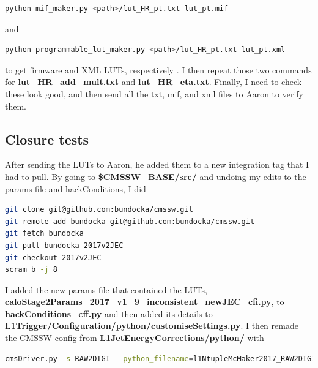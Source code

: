 \begin{lstlisting}[belowskip=-0.7cm, language=sh, numbers=none]
python mif_maker.py <path>/lut_HR_pt.txt lut_pt.mif
\end{lstlisting}

and

\begin{lstlisting}[belowskip=-0.7cm, language=sh, numbers=none]
python programmable_lut_maker.py <path>/lut_HR_pt.txt lut_pt.xml
\end{lstlisting}

to get firmware and XML LUTs, respectively . I then repeat those two commands for \textbf{lut\_HR\_add\_mult.txt} and \textbf{lut\_HR\_eta.txt}. Finally, I need to check these look good, and then send all the txt, mif, and xml files to Aaron to verify them.


\subsection{Closure tests}

After sending the LUTs to Aaron, he added them to a new integration tag that I had to pull. By going to \textbf{\$CMSSW\_BASE/src/} and undoing my edits to the params file and hackConditions, I did

\begin{lstlisting}[belowskip=-0.7cm, language=sh, numbers=none]
git clone git@github.com:bundocka/cmssw.git
git remote add bundocka git@github.com:bundocka/cmssw.git
git fetch bundocka
git pull bundocka 2017v2JEC
git checkout 2017v2JEC
scram b -j 8
\end{lstlisting}

I added the new params file that contained the LUTs, \textbf{caloStage2Params\_2017\_v1\_9\_inconsistent\_newJEC\_cfi.py}, to \textbf{hackConditions\_cff.py} and then added its details to \textbf{L1Trigger/Configuration/python/customiseSettings.py}. I then remade the CMSSW config from \textbf{L1JetEnergyCorrections/python/} with

\begin{lstlisting}[belowskip=-0.7cm, language=sh, numbers=none]
cmsDriver.py -s RAW2DIGI --python_filename=l1NtupleMcMaker2017_RAW2DIGI_v2_closureTest.py -n 100 --no_output --no_exec --era=Run2_2017 --mc --conditions=92X_upgrade2017_TSG_For90XSamples_V1 --customise=L1Trigger/Configuration/customiseReEmul.L1TReEmulMCFrom90xRAWSimHcalTP --customise=L1Trigger/L1TNtuples/customiseL1Ntuple.L1NtupleRAWEMUGEN_MC --customise=L1Trigger/Configuration/customiseSettings.L1TSettingsToCaloStage2Params_2017_v1_9_inconsistent_newJEC --filein=/store/mc/PhaseISpring17DR/QCD_Pt-15to3000_TuneCUETP8M1_Flat_13TeV_pythia8/GEN-SIM-RAW/FlatPU0to70NZS_90X_upgrade2017_realistic_v20-v1/120000/003FF53C-8232-E711-9340-7CD30ACE160C.root
\end{lstlisting}


